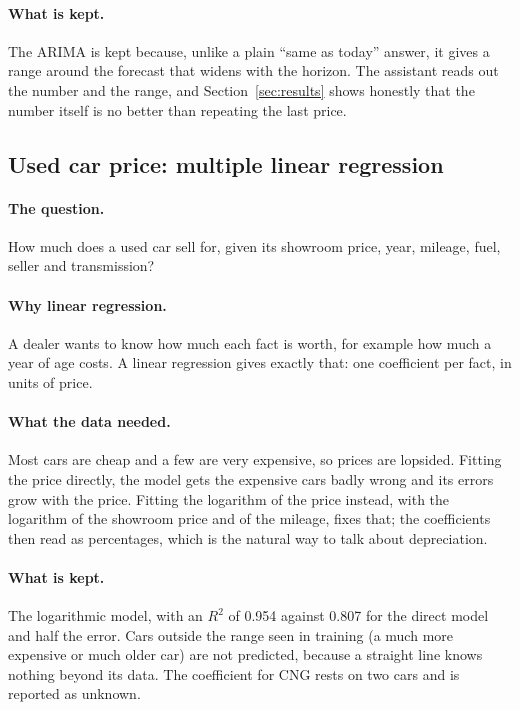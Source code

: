 \paragraph{What is kept.} The ARIMA is kept because, unlike a plain
``same as today'' answer, it gives a range around the forecast that widens
with the horizon. The assistant reads out the number and the range, and
Section~\ref{sec:results} shows honestly that the number itself is no
better than repeating the last price.

\subsection{Used car price: multiple linear regression}

\paragraph{The question.} How much does a used car sell for, given its
showroom price, year, mileage, fuel, seller and transmission?

\paragraph{Why linear regression.} A dealer wants to know how much each
fact is worth, for example how much a year of age costs. A linear
regression gives exactly that: one coefficient per fact, in units of
price.

\paragraph{What the data needed.} Most cars are cheap and a few are very
expensive, so prices are lopsided. Fitting the price directly, the model
gets the expensive cars badly wrong and its errors grow with the price.
Fitting the logarithm of the price instead, with the logarithm of the
showroom price and of the mileage, fixes that; the coefficients then read
as percentages, which is the natural way to talk about depreciation.

\paragraph{What is kept.} The logarithmic model, with an $R^2$ of 0.954
against 0.807 for the direct model and half the error. Cars outside the
range seen in training (a much more expensive or much older car) are not
predicted, because a straight line knows nothing beyond its data. The
coefficient for CNG rests on two cars and is reported as unknown.

